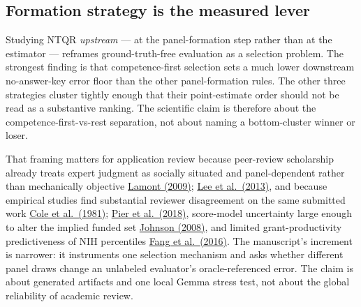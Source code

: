 \documentclass[
]{article}
\begin{document}
\subsection{Formation strategy is the measured
lever}\label{formation-strategy-is-the-measured-lever}

Studying NTQR \emph{upstream} --- at the panel-formation step rather
than at the estimator --- reframes ground-truth-free evaluation as a
selection problem. The strongest finding is that competence-first
selection sets a much lower downstream no-answer-key error floor than
the other panel-formation rules. The other three strategies cluster
tightly enough that their point-estimate order should not be read as a
substantive ranking. The scientific claim is therefore about the
competence-first-vs-rest separation, not about naming a bottom-cluster
winner or loser.

That framing matters for application review because peer-review
scholarship already treats expert judgment as socially situated and
panel-dependent rather than mechanically objective
\href{https://doi.org/10.4159/9780674054158}{Lamont (2009)};
\href{https://doi.org/10.1002/asi.22784}{Lee et al.~(2013)}, and because
empirical studies find substantial reviewer disagreement on the same
submitted work \href{https://doi.org/10.1126/science.7302566}{Cole et
al.~(1981)}; \href{https://doi.org/10.1073/pnas.1714379115}{Pier et
al.~(2018)}, score-model uncertainty large enough to alter the implied
funded set \href{https://doi.org/10.1073/pnas.0804538105}{Johnson
(2008)}, and limited grant-productivity predictiveness of NIH
percentiles \href{https://doi.org/10.7554/eLife.13323}{Fang et
al.~(2016)}. The manuscript's increment is narrower: it instruments one
selection mechanism and asks whether different panel draws change an
unlabeled evaluator's oracle-referenced error. The claim is about
generated artifacts and one local Gemma stress test, not about the
global reliability of academic review.
\end{document}
